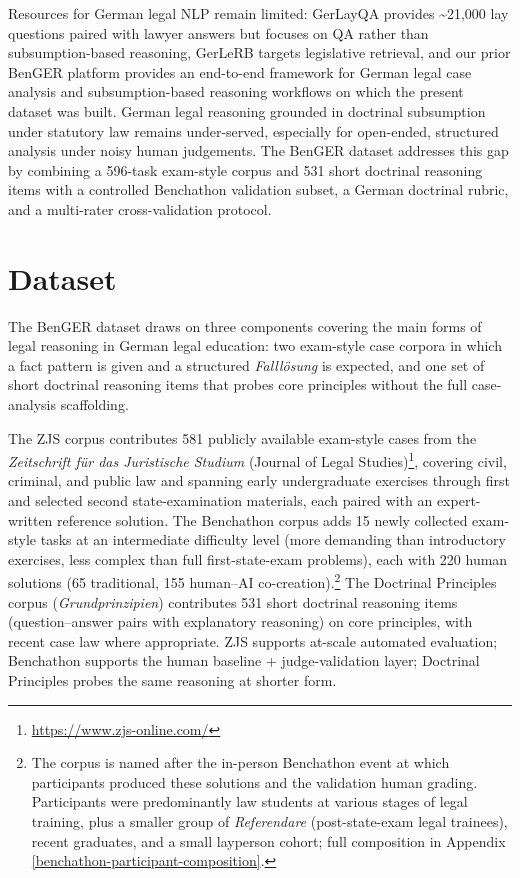 \documentclass[11pt]{article}
\begin{document}
Resources for German legal NLP remain limited: GerLayQA
\citep{buttner2024gerlayqa} provides \textasciitilde21,000 lay questions
paired with lawyer answers but focuses on QA rather than
subsumption-based reasoning, GerLeRB \citep{weber2025gerlerb} targets
legislative retrieval, and our prior BenGER platform
\citep{nagl2026benger} provides an end-to-end framework for German legal
case analysis and subsumption-based reasoning workflows on which the
present dataset was built. German legal reasoning grounded in doctrinal
subsumption under statutory law remains under-served, especially for
open-ended, structured analysis under noisy human judgements. The BenGER
dataset addresses this gap by combining a 596-task exam-style corpus and
531 short doctrinal reasoning items with a controlled Benchathon
validation subset, a German doctrinal rubric, and a multi-rater
cross-validation protocol.

\section{Dataset}\label{dataset}

The BenGER dataset draws on three components covering the main forms of
legal reasoning in German legal education: two exam-style case corpora
in which a fact pattern is given and a structured \emph{Falllösung} is
expected, and one set of short doctrinal reasoning items that probes
core principles without the full case-analysis scaffolding.

The ZJS corpus contributes 581 publicly available exam-style cases from
the \emph{Zeitschrift für das Juristische Studium} (Journal of Legal
Studies)\footnote{\url{https://www.zjs-online.com/}}, covering civil,
criminal, and public law and spanning early undergraduate exercises
through first and selected second state-examination materials, each
paired with an expert-written reference solution. The Benchathon corpus
adds 15 newly collected exam-style tasks at an intermediate difficulty
level (more demanding than introductory exercises, less complex than
full first-state-exam problems), each with 220 human solutions (65
traditional, 155 human--AI co-creation).\footnote{The corpus is named
  after the in-person Benchathon event at which participants produced
  these solutions and the validation human grading. Participants were
  predominantly law students at various stages of legal training, plus a
  smaller group of \emph{Referendare} (post-state-exam legal trainees),
  recent graduates, and a small layperson cohort; full composition in
  Appendix \ref{benchathon-participant-composition}.} The Doctrinal
Principles corpus (\emph{Grundprinzipien}) contributes 531 short
doctrinal reasoning items (question--answer pairs with explanatory
reasoning) on core principles, with recent case law where appropriate.
ZJS supports at-scale automated evaluation; Benchathon supports the
human baseline + judge-validation layer; Doctrinal Principles probes the
same reasoning at shorter form.
\end{document}
